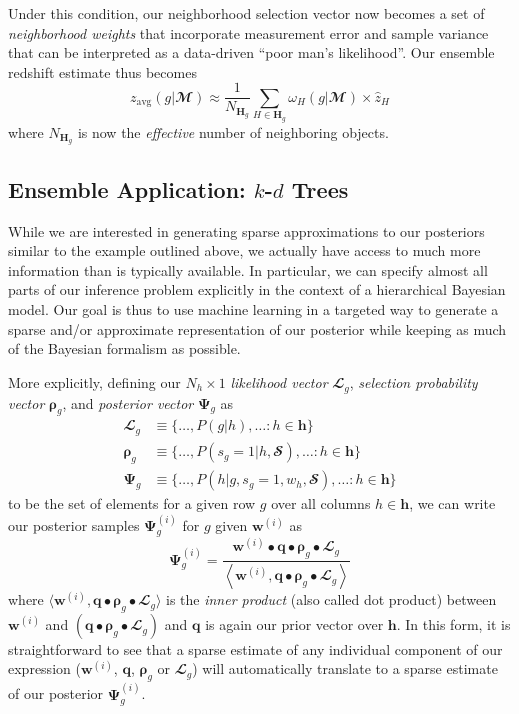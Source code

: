 \documentclass[a4paper,fleqn,usenatbib,english]{mnras}
\newcommand{\rom}[2]{\ensuremath{#1_{\mathrm{#2}}}} %
\begin{document}
Under this condition, our neighborhood selection vector now becomes a set of \textit{neighborhood weights} that incorporate measurement error and sample variance that can be interpreted as a data-driven ``poor man's likelihood''. Our ensemble redshift estimate thus becomes
\begin{equation}
\rom{z}{avg}(g|\mathbfcal{M}) \approx \frac{1}{N_{\mathbf{H}_g}} \sum_{H \in \mathbf{H}_g} \omega_H(g|\mathbfcal{M}) \times \hat{z}_H
\end{equation}
where $N_{\mathbf{H}_g}$ is now the \textit{effective} number of neighboring objects.

\subsection{Ensemble Application: $k$-$d$ Trees}
\label{subsec:kdt_bayes_approx}

While we are interested in generating sparse approximations to our posteriors similar to the example outlined above, we actually have access to much more information than is typically available. In particular, we can specify almost all parts of our inference problem explicitly in the context of a hierarchical Bayesian model. Our goal is thus to use machine learning in a targeted way to generate a sparse and/or approximate representation of our posterior while keeping as much of the Bayesian formalism as possible. 

More explicitly, defining our $N_h \times 1$ \textit{likelihood vector} $\mathbfcal{L}_g$, \textit{selection probability vector} $\boldsymbol{\rho}_g$, and \textit{posterior vector} $\boldsymbol{\Psi}_g$ as
\begin{align}
\mathbfcal{L}_g &\equiv \lbrace \ldots, P(g|h), \ldots : h \in \mathbf{h} \rbrace \\
\boldsymbol{\rho}_g &\equiv \lbrace \ldots, P(s_g=1|h,\mathbfcal{S}), \ldots : h \in \mathbf{h} \rbrace \\
\boldsymbol{\Psi}_g &\equiv \lbrace \ldots, P(h|g,s_g=1,w_h,\mathbfcal{S}), \ldots : h \in \mathbf{h} \rbrace
\end{align}
to be the set of elements for a given row $g$ over all columns $h \in \mathbf{h}$, we can write our posterior samples $\boldsymbol{\Psi}_g^{(i)}$ for $g$ given $\mathbf{w}^{(i)}$ as
\begin{equation}
\boldsymbol{\Psi}_g^{(i)} = \frac{\mathbf{w}^{(i)} \bullet \mathbf{q} \bullet \boldsymbol{\rho}_g \bullet \mathbfcal{L}_g}{\left\langle \mathbf{w}^{(i)} , \mathbf{q} \bullet \boldsymbol{\rho}_g \bullet \mathbfcal{L}_g \right\rangle} 
\end{equation}
where $\langle \mathbf{w}^{(i)}, \mathbf{q} \bullet \boldsymbol{\rho}_g \bullet \mathbfcal{L}_g \rangle$ is the \textit{inner product} (also called dot product) between $\mathbf{w}^{(i)}$ and $\left( \mathbf{q} \bullet \boldsymbol{\rho}_g \bullet \mathbfcal{L}_g \right)$ and $\mathbf{q}$ is again our prior vector over $\mathbf{h}$. In this form, it is straightforward to see that a sparse estimate of any individual component of our expression ($\mathbf{w}^{(i)}$, $\mathbf{q}$, $\boldsymbol{\rho}_g$ or $\mathbfcal{L}_g$) will automatically translate to a sparse estimate of our posterior $\boldsymbol{\Psi}_g^{(i)}$. 
\end{document}
